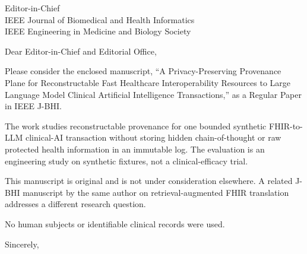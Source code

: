 \documentclass[10pt]{letter}
\date{August 28, 2026}
\renewcommand*{\opening}[1]{\vspace*{-1.2em}{\raggedright \toname \\ \toaddress
  \vspace{1.2em}\par}%
  \noindent #1\par\vspace{0.6em}}
\begin{document}
\begin{letter}{Editor-in-Chief\\
IEEE Journal of Biomedical and Health Informatics\\
IEEE Engineering in Medicine and Biology Society}

\opening{Dear Editor-in-Chief and Editorial Office,}

Please consider the enclosed manuscript, ``A Privacy-Preserving Provenance
Plane for Reconstructable Fast Healthcare Interoperability Resources to Large
Language Model Clinical Artificial Intelligence Transactions,'' as a Regular
Paper in IEEE J-BHI.

The work studies reconstructable provenance for one bounded synthetic
FHIR-to-LLM clinical-AI transaction without storing hidden chain-of-thought
or raw protected health information in an immutable log. The evaluation is an
engineering study on synthetic fixtures, not a clinical-efficacy trial.

This manuscript is original and is not under consideration elsewhere. A
related J-BHI manuscript by the same author on retrieval-augmented FHIR
translation addresses a different research question.

No human subjects or identifiable clinical records were used.

\closing{Sincerely,}

\end{letter}
\end{document}
